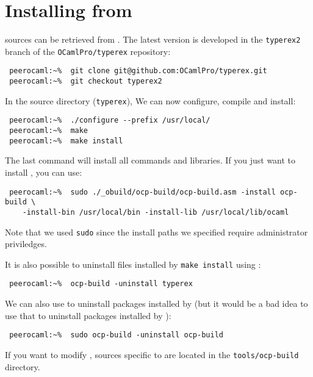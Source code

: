 \section{Installing from \github{}}

\ocpbuild{} sources can be retrieved from \github{}. The latest
version is developed in the {\tt typerex2} branch of the {\tt OCamlPro/typerex}
repository:

\begin{verbatim}
 peerocaml:~%  git clone git@github.com:OCamlPro/typerex.git
 peerocaml:~%  git checkout typerex2
\end{verbatim}

In the source directory ({\tt typerex}), We can now configure, compile
and install:
\begin{verbatim}
 peerocaml:~%  ./configure --prefix /usr/local/
 peerocaml:~%  make
 peerocaml:~%  make install
\end{verbatim}

The last command will install all \typerex{} commands and
libraries. If you just want to install \ocpbuild{}, you can use:

\begin{verbatim}
 peerocaml:~%  sudo ./_obuild/ocp-build/ocp-build.asm -install ocp-build \
    -install-bin /usr/local/bin -install-lib /usr/local/lib/ocaml
\end{verbatim}

Note that we used {\tt sudo} since the install paths we specified
require administrator priviledges.

It is also possible to uninstall files installed by {\tt make install}
using \ocpbuild{}:
\begin{verbatim}
 peerocaml:~%  ocp-build -uninstall typerex
\end{verbatim}

We can also use \ocpbuild{} to uninstall packages installed by
\ocpbuild{} (but it would be a bad idea to use that to uninstall
packages installed by \opam{}):
\begin{verbatim}
 peerocaml:~%  sudo ocp-build -uninstall ocp-build
\end{verbatim}


If you want to modify \ocpbuild{}, sources specific to \ocpbuild{} are
located in the {\tt tools/ocp-build} directory.

